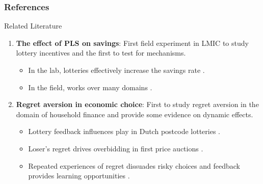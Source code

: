 \documentclass[aspectratio=169]{beamer}
\begin{document}
\begin{frame}[allowframebreaks] \frametitle{References}

	\printbibliography

\end{frame}

\appendix

\begin{frame}{Related Literature}
	
	\begin{enumerate}

		\item \textbf{The effect of PLS on savings}: First field experiment in LMIC to study lottery incentives and the first to test for mechanisms.

		\begin{itemize}
			\item In the lab, lotteries effectively increase the savings rate \parencite{atalay_savings_2014,filiz-ozbay_lottery_2015}.
			\item In the field, works over many domains \parencite{dizon_leveraging_2016,gajic_cost-effectiveness_2011,brune_effect_2015,loibl_testing_2016,gertler_long-term_2017}.
		\end{itemize}

		\item \textbf{Regret aversion in economic choice}: First to study regret aversion in the domain of household finance and provide some evidence on dynamic effects.

		\begin{itemize}
			\item Lottery feedback influences play in Dutch postcode lotteries \parencite{zeelenberg_consequences_2004}.
			\item Loser's regret drives overbidding in first price auctions \parencite{filiz-ozbay_auctions_2007}.
			\item Repeated experiences of regret dissuades risky choices and feedback provides learning opportunities \parencite{imas_regret_2016}.
		\end{itemize}

	\end{enumerate}

\end{frame}
\end{document}
